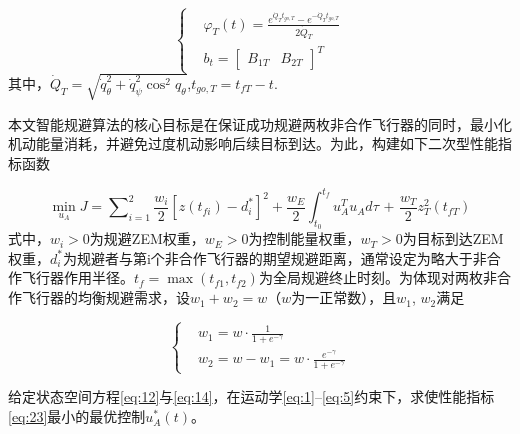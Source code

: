 \begin{equation}
\label{eq:22}
\left\{
\begin{aligned}
& {\varphi _T}(t) = \frac{{{e^{{{\dot Q}_T}{t_{go,T}}}} - {e^{ - {{\dot Q}_T}{t_{go,T}}}}}}{{2{{\dot Q}_T}}} \\
& {b_t} = {\left[ {\begin{array}{*{20}{c}}
  {{B_{1T}}}&{{B_{2T}}}
\end{array}} \right]^T}
\end{aligned}
\right.
\end{equation}
其中，${\dot Q_T} = \sqrt {\dot q_\theta ^2 + \dot q_\psi ^2{{\cos }^2}{q_\theta }} $,${t_{go,T}} = {t_{fT}} - t$.

本文智能规避算法的核心目标是在保证成功规避两枚非合作飞行器的同时，最小化机动能量消耗，并避免过度机动影响后续目标到达。为此，构建如下二次型性能指标函数

\begin{equation}
\label{eq:23}
\mathop {\min }\limits_{{u_A}} J = \sum\nolimits_{i = 1}^2 {\frac{{{w_i}}}{2}{{\left[ {z\left( {{t_{fi}}} \right) - d_i^*} \right]}^2}}  + \frac{{{w_E}}}{2}\int_{{t_0}}^{{t_f}} {u_A^T{u_A}d\tau {\text{ + }}\frac{{{w_T}}}{2}z_T^2\left( {{t_{fT}}} \right)}
\end{equation}
式中，${w_i} > 0$为规避ZEM权重，${w_E} > 0$为控制能量权重，${w_T} > 0$为目标到达ZEM权重，$d_i^*$为规避者与第i个非合作飞行器的期望规避距离，通常设定为略大于非合作飞行器作用半径。${t_f} = \max ({t_{f1}},{t_{f2}})$为全局规避终止时刻。为体现对两枚非合作飞行器的均衡规避需求，设${w_1} + {w_2} = w$（$w$为一正常数），且${w_1}$, ${w_2}$满足

\begin{equation}
\label{eq:24}
\left\{
\begin{aligned}
& {w_1} = w \cdot \frac{1}{{1 + {e^{ - \gamma }}}} \\
& {w_2} = w - {w_1} = w \cdot \frac{{{e^{ - \gamma }}}}{{1 + {e^{ - \gamma }}}}
\end{aligned}
\right.
\end{equation}
\begin{problem}[一体化最优规避与制导]
给定状态空间方程\eqref{eq:12}与\eqref{eq:14}，在运动学\eqref{eq:1}–\eqref{eq:5}约束下，求使性能指标\eqref{eq:23}最小的最优控制$u_A^*(t)$。
\end{problem}
